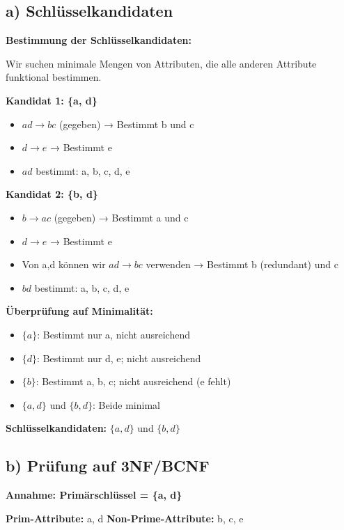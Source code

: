 \documentclass[12pt,a4paper]{article}
\begin{document}
\subsection*{a) Schlüsselkandidaten}

\textbf{Bestimmung der Schlüsselkandidaten:}

Wir suchen minimale Mengen von Attributen, die alle anderen Attribute funktional bestimmen.

\textbf{Kandidat 1: \{a, d\}}
\begin{itemize}
    \item $ad \to bc$ (gegeben) → Bestimmt b und c \checkmark
    \item $d \to e$ → Bestimmt e \checkmark
    \item $ad$ bestimmt: a, b, c, d, e \checkmark
\end{itemize}

\textbf{Kandidat 2: \{b, d\}}
\begin{itemize}
    \item $b \to ac$ (gegeben) → Bestimmt a und c \checkmark
    \item $d \to e$ → Bestimmt e \checkmark
    \item Von a,d können wir $ad \to bc$ verwenden → Bestimmt b (redundant) und c \checkmark
    \item $bd$ bestimmt: a, b, c, d, e \checkmark
\end{itemize}

\textbf{Überprüfung auf Minimalität:}
\begin{itemize}
    \item $\{a\}$: Bestimmt nur a, nicht ausreichend
    \item $\{d\}$: Bestimmt nur d, e; nicht ausreichend
    \item $\{b\}$: Bestimmt a, b, c; nicht ausreichend (e fehlt)
    \item $\{a, d\}$ und $\{b, d\}$: Beide minimal
\end{itemize}

\textbf{Schlüsselkandidaten:} $\boxed{\{a, d\} \text{ und } \{b, d\}}$

\subsection*{b) Prüfung auf 3NF/BCNF}

\textbf{Annahme: Primärschlüssel = \{a, d\}}

\textbf{Prim-Attribute:} a, d
\textbf{Non-Prime-Attribute:} b, c, e
\end{document}
